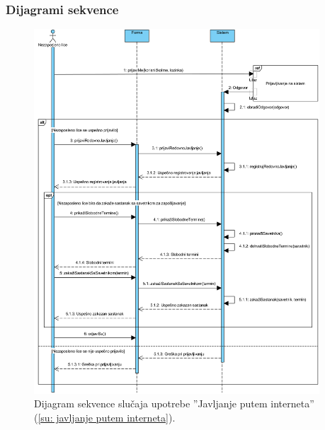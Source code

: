\subsubsection{Dijagrami sekvence}

\begin{figure}[H]
	\centering
	\includegraphics[width=0.95\textwidth]{dijagrami/dijagrami-sekvence/javljanje-putem-interneta.png}
	\caption{Dijagram sekvence slu\v caja upotrebe ''Javljanje putem interneta'' (\ref{su: javljanje putem interneta}).}
\end{figure}